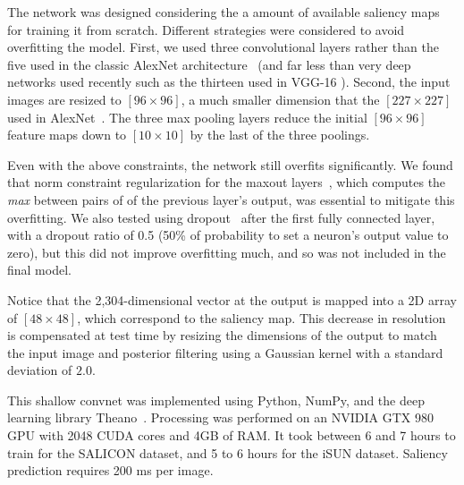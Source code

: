 \documentclass[10pt,twocolumn,letterpaper]{article}
\begin{document}
The network was designed considering the a amount of available saliency maps for training it from scratch.
Different strategies were considered to avoid overfitting the model.
First, we used three convolutional layers rather than the five used in the classic AlexNet architecture~\cite{krizhevsky2012imagenet} (and far less than very deep networks used recently such as the thirteen used in VGG-16 \cite{simonyan2014very}).
Second, the input images are resized to $[96 \times 96]$, a much smaller dimension that the $[227 \times 227]$ used in AlexNet~\cite{krizhevsky2012imagenet}.
The three max pooling layers reduce the initial $[96 \times 96]$ feature maps down to $[10 \times 10]$ by the last of the three  poolings.

Even with the above constraints, the network still overfits significantly. We found that norm constraint regularization for the maxout layers~\cite{goodfellow2013maxout}, which computes the \textit{max} between pairs of of the previous layer’s output,
was essential to mitigate this overfitting.
We also tested using dropout~\cite{hinton2012improving} after the first fully connected layer, with a dropout ratio of 0.5 (50\% of probability to set a neuron's output value to zero), but this did not improve overfitting much, and so was not included in the final model.

Notice that the 2,304-dimensional vector at the output is mapped into a 2D array of $[48 \times 48]$, which correspond to the saliency map.
This decrease in resolution is compensated at test time by resizing the dimensions of the output to match the input image and posterior filtering using a Gaussian kernel with a standard deviation of $2.0$.

This shallow convnet was implemented using Python, NumPy, and the deep learning library Theano~\cite{bergstra2010theano, bastien2012theano}. 
Processing was performed on an NVIDIA GTX 980 GPU with 2048 CUDA cores and 4GB of RAM. 
It took between 6 and 7 hours to train for the SALICON dataset, and 5 to 6 hours for the iSUN dataset.
Saliency prediction requires 200 ms per image.
\end{document}
